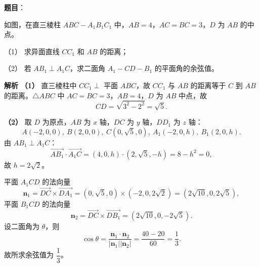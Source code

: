 \begin{answer}

\textbf{题目}：

如图，在直三棱柱 $ABC-A_1B_1C_1$ 中，$AB=4$，$AC=BC=3$，$D$ 为 $AB$ 的中点。

（1） 求异面直线 $CC_1$ 和 $AB$ 的距离；

（2） 若 $AB_1\perp A_1C$，求二面角 $A_1-CD-B_1$ 的平面角的余弦值。
\nopagebreak[4]
\begin{center}\end{center}
\nopagebreak[4]
\textbf{解析}
\textbf{（1）} 直三棱柱中 $CC_1\perp$ 平面 $ABC$，故 $CC_1$ 与 $AB$ 的距离等于 $C$ 到 $AB$ 的距离。$\triangle ABC$ 中 $AC=BC=3$，$AB=4$，$D$ 为 $AB$ 中点，故
\nopagebreak[4]
\[CD=\sqrt{3^2-2^2}=\sqrt5.\]

\textbf{（2）} 取 $D$ 为原点，$AB$ 为 $x$ 轴，$DC$ 为 $y$ 轴，$DD_1$ 为 $z$ 轴：
\nopagebreak[4]
\[A(-2,0,0),\ B(2,0,0),\ C(0,\sqrt5,0),\ A_1(-2,0,h),\ B_1(2,0,h).\]
由 $AB_1\perp A_1C$：
\nopagebreak[4]
\[\overrightarrow{AB_1}\cdot\overrightarrow{A_1C}=(4,0,h)\cdot(2,\sqrt5,-h)=8-h^2=0,\]
故 $h=2\sqrt2$。

平面 $A_1CD$ 的法向量
\nopagebreak[4]
\[\boldsymbol n_1=\overrightarrow{DC}\times\overrightarrow{DA_1}=(0,\sqrt5,0)\times(-2,0,2\sqrt2)=(2\sqrt{10},0,2\sqrt5),\]
平面 $B_1CD$ 的法向量
\nopagebreak[4]
\[\boldsymbol n_2=\overrightarrow{DC}\times\overrightarrow{DB_1}=(2\sqrt{10},0,-2\sqrt5).\]
设二面角为 $\theta$，则
\nopagebreak[4]
\[\cos\theta=\frac{\boldsymbol n_1\cdot\boldsymbol n_2}{|\boldsymbol n_1||\boldsymbol n_2|}=\frac{40-20}{60}=\frac13.\]
故所求余弦值为 $\dfrac13$。



\end{answer}
